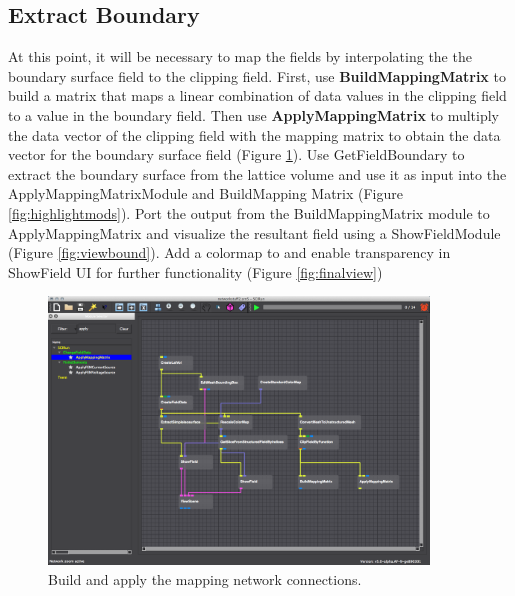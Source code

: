 \documentclass[fleqn,11pt,openany]{book}
\begin{document}
\subsection{Extract Boundary}\label{clipvol}


At this point, it will be necessary to map the fields by interpolating the the boundary surface field to the clipping field.
First, use \textbf{BuildMappingMatrix} to build a matrix that maps a linear combination of data values in the clipping field to a value in the boundary field. Then use \textbf{ApplyMappingMatrix} to multiply the data vector of the clipping field with the mapping matrix to obtain the data vector for the boundary surface field (Figure \ref{fig:mappingmatrix}). Use GetFieldBoundary to extract the boundary surface from the lattice volume and use it as input into the ApplyMappingMatrixModule and BuildMapping Matrix (Figure \ref{fig:highlightmods}). Port the output from the BuildMappingMatrix module to ApplyMappingMatrix and visualize the resultant field using a ShowFieldModule (Figure \ref{fig:viewbound}). Add a colormap to and enable transparency in ShowField UI for further functionality (Figure \ref{fig:finalview})

\begin{figure}[H]
\center
\includegraphics[width=0.9\textwidth]{BasicTutorial_figures/mappingmatrix.png}
\caption{Build and apply the mapping network connections.}
\label{fig:mappingmatrix}
\end{figure}
\end{document}
